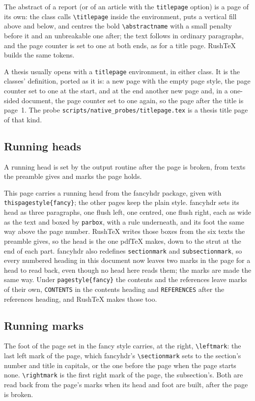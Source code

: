 \documentclass{article}
\numberwithin{equation}{section}
\theoremstyle{definition}
\theoremstyle{remark}
\begin{document}
The abstract of a report (or of an article with the \texttt{titlepage} option) is a page of
its own: the class calls \verb|\titlepage| inside the environment, puts a vertical fill
above and below, and centres the bold \verb|\abstractname| with a small penalty before
it and an unbreakable one after; the text follows in ordinary paragraphs, and the page
counter is set to one at both ends, as for a title page. RushTeX builds the same tokens.

A thesis usually opens with a \texttt{titlepage} environment, in either class. It is the
classes' definition, ported as it is: a new page with the empty page style, the page
counter set to one at the start, and at the end another new page and, in a one-sided
document, the page counter set to one again, so the page after the title is page~1. The
probe \texttt{scripts/native\_probes/titlepage.tex} is a thesis title page of that kind.

\subsection{Running heads}\label{sec:heads}
A running head is set by the output routine after the page is broken, from texts the
preamble gives and marks the page holds.

This page carries a running head from the fancyhdr package, given with
\texttt{thispagestyle\{fancy\}}; the other pages keep the plain style. fancyhdr sets
its head as three paragraphs, one flush left, one centred, one flush right, each as wide
as the text and boxed by \texttt{parbox}, with a rule underneath, and its foot the same
way above the page number. RushTeX writes those boxes from the six texts the preamble
gives, so the head is the one pdf\TeX{} makes, down to the strut at the end of each part.
fancyhdr also redefines \texttt{sectionmark} and \texttt{subsectionmark}, so every
numbered heading in this document now leaves two marks in the page for a head to read
back, even though no head here reads them; the marks are made the same way. Under
\texttt{pagestyle\{fancy\}} the contents and the references leave marks of their own,
\texttt{CONTENTS} in the contents heading and \texttt{REFERENCES} after the references
heading, and RushTeX makes those too.
\thispagestyle{fancy}

\subsection{Running marks}\label{sec:marks}
The foot of the page set in the fancy style carries, at the right, \texttt{\textbackslash leftmark}: the last
left mark of the page, which fancyhdr's \texttt{\textbackslash sectionmark} sets to the
section's number and title in capitals, or the one before the page when the page starts
none. \texttt{\textbackslash rightmark} is the first right mark of the page, the subsection's.
Both are read back from the page's marks when its head and foot are built, after the page is
broken.
\end{document}
